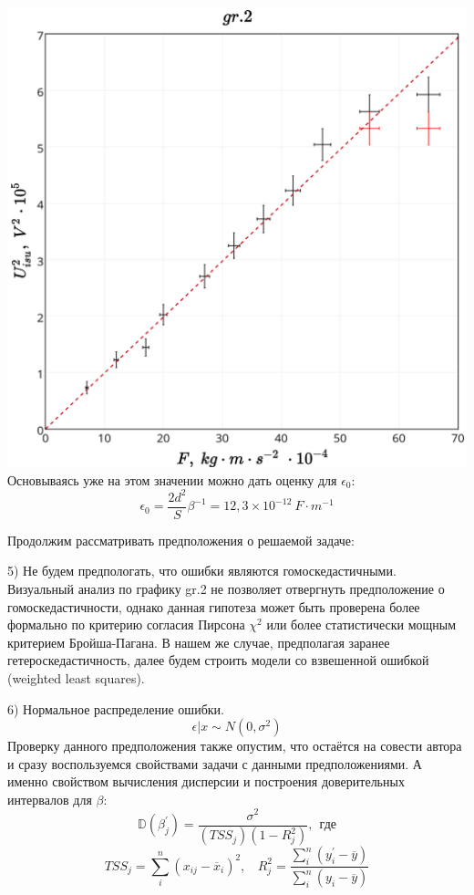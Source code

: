 \includegraphics[scale = 0.20]{my_plot2.png}\\

Основываясь уже на этом значении можно дать оценку для $\epsilon_0$:
$$ \epsilon_0 = \frac{2d^2}{S} \beta^{-1} = 12,3 \times 10^{-12} \ F \cdot m^{-1} $$

Продолжим рассматривать предположения о решаемой задаче:

5) Не будем предпологать, что ошибки являются гомоскедастичными. Визуальный анализ по графику gr.2 не позволяет отвергнуть предположение о гомоскедастичности, однако данная гипотеза может быть проверена более формально по критерию согласия Пирсона $\chi^2$ или более статистически мощным критерием Бройша-Пагана. В нашем же случае, предполагая заранее гетероскедастичность, далее будем строить модели со взвешенной ошибкой (weighted least squares).

6) Нормальное распределение ошибки. 
$$ \epsilon|x \sim N(0, \sigma^2) $$ 
Проверку данного предположения также опустим, что остаётся на совести автора и сразу воспользуемся свойствами задачи с данными предположениями. А именно свойством вычисления дисперсии и построения доверительных интервалов для $\beta$: 
$$ \mathds{D}(\beta_j^{'})= \frac{\sigma^2}{(TSS_j)(1-R_j^2)},~~\text{где}$$
$$ TSS_j = \sum_i^n (x_{ij}- \overline{x}_i)^2,~~~~R^2_j=\frac{\sum_i^n (y_i^{'}-\overline{y})}{\sum_i^n (y_i-\overline{y})} $$

